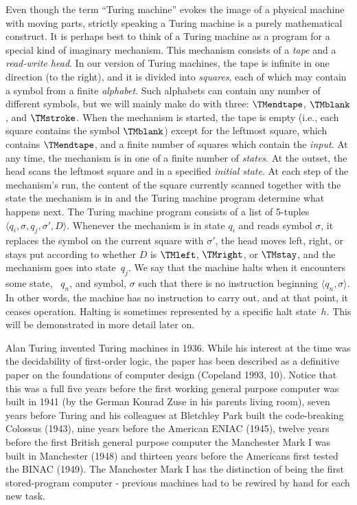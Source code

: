 \documentclass[../../include/open-logic-section]{subfiles}
\begin{document}
\begin{explain}
 Even though the term ``Turing machine'' evokes the image of
a physical machine with moving parts, strictly speaking a Turing machine is
a purely mathematical construct. It is perhaps best to think of a Turing
machine as a program for a special kind of imaginary mechanism. This
mechanism consists of a \emph{tape} and a \emph{read-write head}. In our
version of Turing machines, the tape is infinite in one direction (to the
right), and it is divided into \emph{squares}, each of which may contain a
symbol from a finite \emph{alphabet}. Such alphabets can contain any number
of different symbols, but we will mainly make do with three: $\TMendtape$,
$\TMblank$, and $\TMstroke$. When the mechanism is started, the tape is
empty (i.e., each square contains the symbol $\TMblank$) except for the
leftmost square, which contains $\TMendtape$, and a finite number of
squares which contain the \emph{input}. At any time, the mechanism is in
one of a finite number of \emph{states}. At the outset, the head scans the
leftmost square and in a specified \emph{initial state}. At each step of
the mechanism's run, the content of the square currently scanned together
with the state the mechanism is in and the Turing machine program determine
what happens next. The Turing machine program consists of a list of
5-tuples $\langle q_i, \sigma, q_j, \sigma', D\rangle$. Whenever the
mechanism is in state $q_i$ and reads symbol $\sigma$, it replaces the
symbol on the current square with $\sigma'$, the head moves left, right, or
stays put according to whether $D$ is $\TMleft$, $\TMright$, or $\TMstay$,
and the mechanism goes into state~$q_j$. We say that the machine halts when
it encounters some state, ~$q_n$, and symbol, $\sigma$ such that there is
no instruction beginning $\langle q_n, \sigma\rangle$. In other words, the
machine has no instruction to carry out, and at that point, it ceases
operation. Halting is sometimes represented by a specific halt state~$h$.
This will be demonstrated in more detail later on.

Alan Turing invented Turing machines in 1936. While his interest at the
time was the decidability of first-order logic, the paper has been
described as a definitive paper on the foundations of computer design
(Copeland 1993, 10). Notice that this was a full five years before the
first working general purpose computer was built in 1941 (by the German
Konrad Zuse in his parents living room), seven years before Turing and his
colleagues at Bletchley Park built the code-breaking Colossus (1943), nine
years before the American ENIAC (1945), twelve years before the first
British general purpose computer the Manchester Mark I was built in
Manchester (1948) and thirteen years before the Americans first tested the
BINAC (1949). The Manchester Mark I has the distinction of being the first
stored-program computer - previous machines had to be rewired by hand for
each new task. \end{explain}
\end{document}
